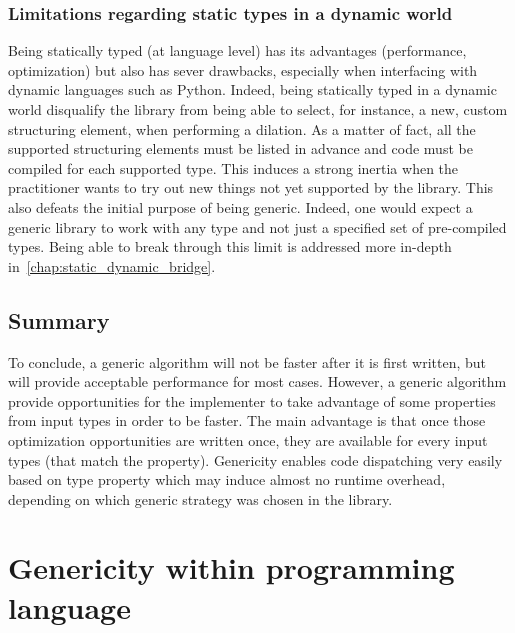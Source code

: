 \subsubsection{Limitations regarding static types in a dynamic world}

Being statically typed (at language level) has its advantages (performance, optimization) but also has sever drawbacks,
especially when interfacing with dynamic languages such as Python. Indeed, being statically typed in a dynamic world
disqualify the library from being able to select, for instance, a new, custom structuring element, when performing a
dilation. As a matter of fact, all the supported structuring elements must be listed in advance and code must be
compiled for each supported type. This induces a strong inertia when the practitioner wants to try out new things not
yet supported by the library. This also defeats the initial purpose of being generic. Indeed, one would expect a generic
library to work with any type and not just a specified set of pre-compiled types. Being able to break through this limit
is addressed more in-depth in~\cref{chap:static_dynamic_bridge}.


\subsection{Summary}

To conclude, a generic algorithm will not be faster after it is first written, but will provide acceptable performance
for most cases. However, a generic algorithm provide opportunities for the implementer to take advantage of some
properties from input types in order to be faster. The main advantage is that once those optimization opportunities are
written once, they are available for every input types (that match the property). Genericity enables code dispatching
very easily based on type property which may induce almost no runtime overhead, depending on which generic strategy was
chosen in the library.


\section{Genericity within programming language}
\label{sec:gen.genericity.within.programming.languages}

